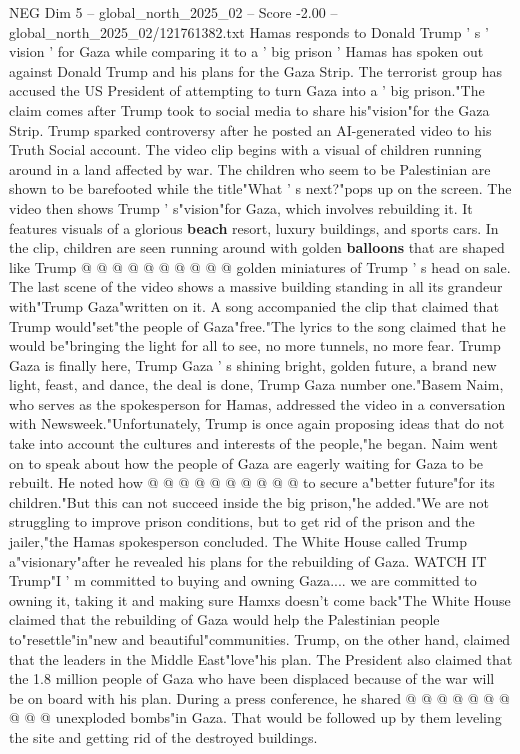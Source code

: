 \begin{textsample}{NEG Dim 5 – global\_north\_2025\_02 – Score -2.00 – global\_north\_2025\_02/121761382.txt}  \label{ex:f5_neg_121}
Hamas responds to Donald Trump ' s ' vision ' for Gaza while comparing it to a ' big prison ' Hamas has spoken out against Donald Trump and his plans for the Gaza Strip.
The terrorist group has accused the US President of attempting to turn Gaza into a ' big prison."The claim comes after Trump took to social media to share his"vision"for the Gaza Strip.
Trump sparked controversy after he posted an AI-generated video to his Truth Social account.
The video clip begins with a visual of children running around in a land affected by war.
The children who seem to be Palestinian are shown to be barefooted while the title"What ' s next?"pops up on the screen.
The video then shows Trump ' s"vision"for Gaza, which involves rebuilding it.
It features visuals of a glorious \textbf{beach} resort, luxury buildings, and sports cars.
In the clip, children are seen running around with golden \textbf{balloons} that are shaped like Trump @ @ @ @ @ @ @ @ @ @ golden miniatures of Trump ' s head on sale.
The last scene of the video shows a massive building standing in all its grandeur with"Trump Gaza"written on it.
A song accompanied the clip that claimed that Trump would"set"the people of Gaza"free."The lyrics to the song claimed that he would be"bringing the light for all to see, no more tunnels, no more fear.
Trump Gaza is finally here, Trump Gaza ' s shining bright, golden future, a brand new light, feast, and dance, the deal is done, Trump Gaza number one."Basem Naim, who serves as the spokesperson for Hamas, addressed the video in a conversation with Newsweek."Unfortunately, Trump is once again proposing ideas that do not take into account the cultures and interests of the people,"he began.
Naim went on to speak about how the people of Gaza are eagerly waiting for Gaza to be rebuilt.
He noted how @ @ @ @ @ @ @ @ @ @ to secure a"better future"for its children."But this can not succeed inside the big prison,"he added."We are not struggling to improve prison conditions, but to get rid of the prison and the jailer,"the Hamas spokesperson concluded.
The White House called Trump a"visionary"after he revealed his plans for the rebuilding of Gaza.
WATCH IT Trump"I ' m committed to buying and owning Gaza.... we are committed to owning it, taking it and making sure Hamxs doesn't come back"The White House claimed that the rebuilding of Gaza would help the Palestinian people to"resettle"in"new and beautiful"communities.
Trump, on the other hand, claimed that the leaders in the Middle East"love"his plan.
The President also claimed that the 1.8 million people of Gaza who have been displaced because of the war will be on board with his plan.
During a press conference, he shared @ @ @ @ @ @ @ @ @ @ unexploded bombs"in Gaza.
That would be followed up by them leveling the site and getting rid of the destroyed buildings.

\end{textsample}
